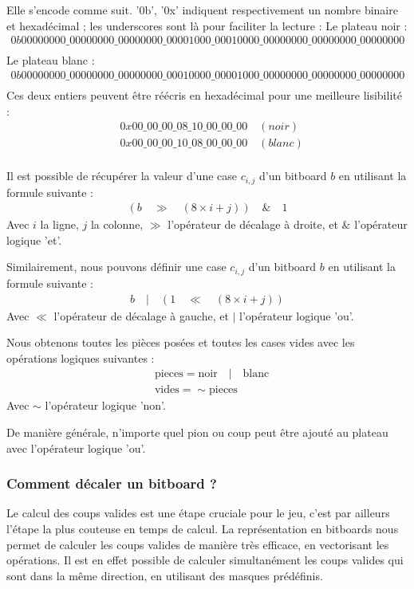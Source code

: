 Elle s'encode comme suit. '0b', '0x' indiquent respectivement un nombre binaire et hexadécimal ; les underscores sont là pour faciliter la lecture :
\newline \newline
\noindent Le plateau noir : 
\begin{align*}
0b00000000\_00000000\_00000000\_00001000\_00010000\_00000000\_00000000\_00000000 \\
\end{align*}
Le plateau blanc :
\begin{align*}
0b00000000\_00000000\_00000000\_00010000\_00001000\_00000000\_00000000\_00000000 \\
\end{align*}
Ces deux entiers peuvent être réécris en hexadécimal pour une meilleure lisibilité :
\begin{align*}
    &0x00\_00\_00\_08\_10\_00\_00\_00 \quad (noir)\\
    &0x00\_00\_00\_10\_08\_00\_00\_00 \quad (blanc)\\
\end{align*}

Il est possible de récupérer la valeur d'une case $c_{i,j}$ d'un bitboard $b$ en utilisant la formule suivante : 
\begin{align*}
    (b\quad \gg\quad (8\times i+j))\quad \&\quad 1
\end{align*}
Avec $i$ la ligne, $j$ la colonne, $\gg$ l'opérateur de décalage à droite, et $\&$ l'opérateur logique 'et'.

Similairement, nous pouvons définir une case $c_{i,j}$ d'un bitboard $b$ en utilisant la formule suivante :
\begin{align*}
    b\quad |\quad (1\quad \ll\quad (8\times i+j))
\end{align*}
Avec $\ll$ l'opérateur de décalage à gauche, et $|$ l'opérateur logique 'ou'.

Nous obtenons toutes les pièces posées et toutes les cases vides avec les opérations logiques suivantes :
\begin{align*}
    &\text{pieces} = \text{noir} \quad | \quad \text{blanc} \\
    &\text{vides} = \sim \text{pieces}
\end{align*}
Avec $\sim$ l'opérateur logique 'non'.

De manière générale, n'importe quel pion ou coup peut être ajouté au plateau avec l'opérateur logique 'ou'.

\subsubsection{Comment décaler un bitboard ?}
\label{subsec:shift}
Le calcul des coups valides est une étape cruciale pour le jeu, c'est par ailleurs l'étape la plus couteuse en temps de calcul. La représentation en bitboards nous permet de calculer les coups valides de manière très efficace, en vectorisant les opérations. Il est en effet possible de calculer simultanément les coups valides qui sont dans la même direction, en utilisant des masques prédéfinis. 

